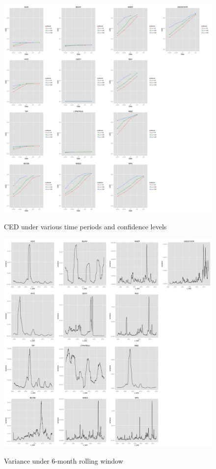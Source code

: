 \documentclass[12pt]{article}
\begin{document}
\begin{figure}[h]
\caption{CED under various time periods and confidence levels}
\centering 
\includegraphics[width=18cm]{../results/CED}
\label{fig: CED}
\end{figure}

\begin{figure}[h]
\caption{Variance under 6-month rolling window} 
\centering 
\includegraphics[width=18cm]{../results/variance6mon}
\label{fig: variance6mon}
\end{figure}
\end{document}
